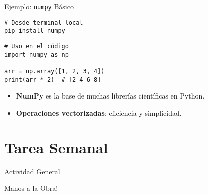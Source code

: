 \documentclass[10pt]{beamer}
\begin{document}
\begin{frame}[fragile]{Ejemplo: \texttt{numpy} Básico}
\begin{verbatim}
# Desde terminal local
pip install numpy
\end{verbatim}
\begin{verbatim}
# Uso en el código
import numpy as np

arr = np.array([1, 2, 3, 4])
print(arr * 2)  # [2 4 6 8]
\end{verbatim}
\begin{itemize}
  \item \textbf{NumPy} es la base de muchas librerías científicas en Python.
  \item \textbf{Operaciones vectorizadas}: eficiencia y simplicidad.
\end{itemize}
\end{frame}

\section{Tarea Semanal}

\begin{frame}{Actividad General}
\begin{center}
  \huge{Manos a la Obra!}
\end{center}
\end{frame}
\end{document}
